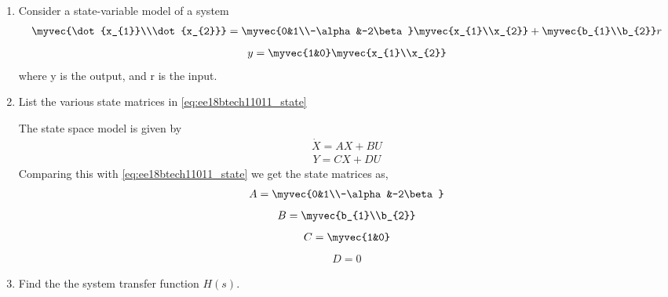 \begin{enumerate}[label=\thesubsection.\arabic*.,ref=\thesubsection.\theenumi]

\item Consider a state-variable model of a system 
\begin{align}
\label{eq:ee18btech11011_state}
\myvec{\dot{x_{1}}\\\dot{x_{2}}}
=
\myvec{0&1\\-\alpha&-2\beta}\myvec{x_{1}\\x_{2}}
+
\myvec{b_{1}\\b_{2}}  r
\end{align}
\begin{align}
y
=
\myvec{1&0}\myvec{x_{1}\\x_{2}}
\end{align}
where y is the output, and r is the input.
%
\item List the various state matrices in \eqref{eq:ee18btech11011_state}

\solution The state space model is given by
\begin{align}
\dot{X} = AX + BU
\end{align}
\begin{align}
Y = CX + DU
\end{align}
Comparing this with \eqref{eq:ee18btech11011_state} we get the state matrices as,
\begin{align}
    A = \myvec{0&1\\-\alpha&-2\beta}
\end{align}
\begin{align}
    B = \myvec{b_{1}\\b_{2}}
\end{align}
\begin{align}
    C = \myvec{1&0}
\end{align}
\begin{align}
    D = 0
\end{align}

\item Find the the system transfer function $H(s)$.


\end{enumerate}

